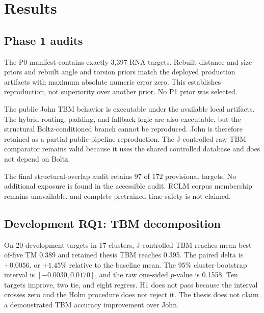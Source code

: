 \documentclass[12pt,a4paper,oneside]{report}
\begin{document}
\chapter{Results}

\section{Phase 1 audits}

The P0 manifest contains exactly 3,397 RNA targets. Rebuilt distance and size priors
and rebuilt angle and torsion priors match the deployed production artifacts with
maximum absolute numeric error zero. This establishes reproduction, not superiority
over another prior. No P1 prior was selected.

The public John TBM behavior is executable under the available local artifacts. The
hybrid routing, padding, and fallback logic are also executable, but the structural
Boltz-conditioned branch cannot be reproduced. John is therefore retained as a
partial public-pipeline reproduction. The J-controlled raw TBM comparator remains
valid because it uses the shared controlled database and does not depend on Boltz.

The final structural-overlap audit retains 97 of 172 provisional targets. No additional
exposure is found in the accessible audit. RCLM corpus membership remains unavailable,
and complete pretrained time-safety is not claimed.

\section{Development RQ1: TBM decomposition}

On 20 development targets in 17 clusters, J-controlled TBM reaches mean best-of-five
TM 0.389 and retained thesis TBM reaches 0.395. The paired delta is $+0.0056$, or
$+1.45\%$ relative to the baseline mean. The 95\% cluster-bootstrap interval is
$[-0.0030,0.0170]$, and the raw one-sided $p$-value is 0.1558. Ten targets improve,
two tie, and eight regress. H1 does not pass because the interval crosses zero and the
Holm procedure does not reject it. The thesis does not claim a demonstrated TBM
accuracy improvement over John.
\end{document}
